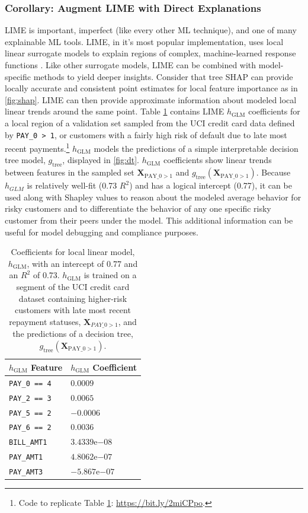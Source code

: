 \documentclass{article}
\begin{document}
\subsubsection{Corollary: Augment LIME with Direct Explanations} LIME is important, imperfect (like every other ML technique), and one of many explainable ML tools. LIME, in it's most popular implementation, uses local linear surrogate models to explain regions of complex, machine-learned response functions \cite{lime}. Like other surrogate models, LIME can be combined with model-specific methods to yield deeper insights. Consider that tree SHAP can provide locally accurate and consistent point estimates for local feature importance as in \ref{fig:shap}. LIME can then provide approximate information about modeled local linear trends around the same point. Table \ref{tab:lime} contains LIME $h_{\text{GLM}}$ coefficients for a local region of a validation set sampled from the UCI credit card data defined by \texttt{PAY\_0 > 1}, or customers with a fairly high risk of default due to late most recent payments.\footnote{\scriptsize{Code to replicate Table \ref{tab:lime}: \url{https://bit.ly/2miCPpo}.}} $h_{\text{GLM}}$ models the predictions of a simple interpretable decision tree model, $g_{\text{tree}}$, displayed in \ref{fig:dt}. $h_{\text{GLM}}$ coefficients show linear trends between features in the sampled set $\mathbf{X}_{\text{PAY\_0} > 1}$ and $g_{\text{tree}}(\mathbf{X}_{\text{PAY\_0}> 1})$. Because $h_{GLM}$ is relatively well-fit (0.73 $R^2$) and has a logical intercept (0.77), it can be used along with Shapley values to reason about the modeled average behavior for risky customers and to differentiate the behavior of any one specific risky customer from their peers under the model. This additional information can be useful for model debugging and compliance purposes.

\begin{table}
  	\caption{Coefficients for local linear model, $h_{\text{GLM}}$, with an intercept of 0.77 and an $R^2$ of 0.73. $h_{\text{GLM}}$ is trained on a segment of the UCI credit card dataset containing higher-risk customers with late most recent repayment statuses, $\mathbf{X}_{PAY \_ 0 > 1}$, and the predictions of a decision tree, $g_{\text{tree}}(\mathbf{X}_{\text{PAY\_0} > 1})$.\\}
  	\label{tab:lime}
  	\centering
  	\begin{tabular}{ll}
    	\toprule
    	$h_{\text{GLM}}$ Feature & $h_{\text{GLM}}$ Coefficient \\
    	\midrule
		\texttt{PAY\_0 == 4} & $0.0009$ \\
		\texttt{PAY\_2 == 3} & $0.0065$ \\
		\texttt{PAY\_5 == 2} & $-0.0006$ \\
		\texttt{PAY\_6 == 2} & $0.0036$ \\			
		\texttt{BILL\_AMT1} & $3.4339\mathrm{e}{-08}$ \\
		\texttt{PAY\_AMT1} & $4.8062\mathrm{e}{-07}$ \\
		\texttt{PAY\_AMT3} & $-5.867\mathrm{e}{-07}$ \\	
    	\bottomrule
  \end{tabular}
\end{table}
\end{document}
